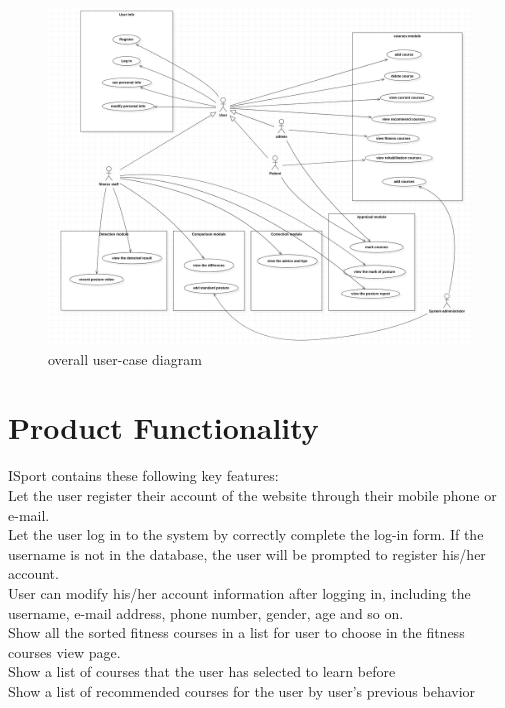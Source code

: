 \documentclass[16pt]{scrreprt}
\begin{document}
\begin{figure}[H]
	\centering
	\includegraphics[width=1.0\textwidth]{figures/big-user-case.png}
	\caption{overall user-case diagram}
\end{figure}



\section{Product Functionality}

ISport contains these following key features:\\
Let the user register their account of the website through their mobile phone or e-mail.\\

 
Let the user log in to the system by correctly complete the log-in form. If the username is not in the database, the user will be prompted to register his/her account.\\

 
User can modify his/her account information after logging in, including the username, e-mail address, phone number, gender, age and so on.\\

 
Show all the sorted fitness courses in a list for user to choose in the fitness courses view page. \\

 
Show a list of courses that the user has selected to learn before\\

 
Show a list of recommended courses for the user by user's previous behavior \\
\end{document}
